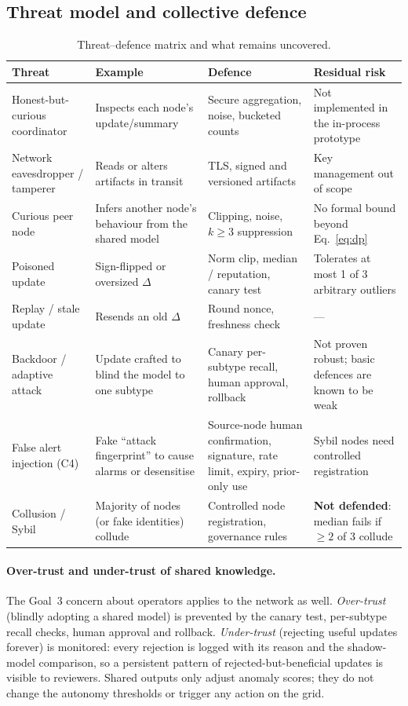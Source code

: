 \documentclass[11pt,a4paper]{article}
\newcommand{\hdr}{\rowcolor{emblue!15}}
\begin{document}
\subsection{Threat model and collective defence}

\begin{table}[H]
\centering\small
\caption{Threat--defence matrix and what remains uncovered.}
\label{tab:threats}
\begin{tabularx}{\textwidth}{@{}p{3.1cm} Y Y Y@{}}
\toprule\hdr
Threat & Example & Defence & Residual risk \\
\midrule
Honest-but-curious coordinator & Inspects each node's update/summary & Secure aggregation, noise, bucketed counts & Not implemented in the in-process prototype \\
Network eavesdropper / tamperer & Reads or alters artifacts in transit & TLS, signed and versioned artifacts & Key management out of scope \\
Curious peer node & Infers another node's behaviour from the shared model & Clipping, noise, $k\!\ge\!3$ suppression & No formal bound beyond Eq.~\eqref{eq:dp} \\
Poisoned update & Sign-flipped or oversized $\Delta$ & Norm clip, median / reputation, canary test & Tolerates at most 1 of 3 arbitrary outliers \\
Replay / stale update & Resends an old $\Delta$ & Round nonce, freshness check & --- \\
Backdoor / adaptive attack & Update crafted to blind the model to one subtype~\cite{bagdasaryan2020} & Canary per-subtype recall, human approval, rollback & Not proven robust; basic defences are known to be weak \\
False alert injection (C4) & Fake ``attack fingerprint'' to cause alarms or desensitise & Source-node human confirmation, signature, rate limit, expiry, prior-only use & Sybil nodes need controlled registration \\
Collusion / Sybil & Majority of nodes (or fake identities) collude & Controlled node registration, governance rules & \textbf{Not defended}: median fails if $\ge2$ of 3 collude \\
\bottomrule
\end{tabularx}
\end{table}

\paragraph{Over-trust and under-trust of shared knowledge.} The Goal~3 concern about operators applies to the network as well. \emph{Over-trust} (blindly adopting a shared model) is prevented by the canary test, per-subtype recall checks, human approval and rollback. \emph{Under-trust} (rejecting useful updates forever) is monitored: every rejection is logged with its reason and the shadow-model comparison, so a persistent pattern of rejected-but-beneficial updates is visible to reviewers. Shared outputs only adjust anomaly scores; they do not change the autonomy thresholds or trigger any action on the grid.
\end{document}
